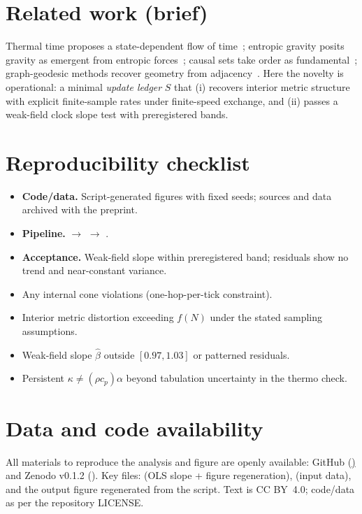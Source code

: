 \documentclass[11pt,a4paper]{article}
\begin{document}
\section*{Related work (brief)}
Thermal time proposes a state-dependent flow of time~\cite{Rovelli1993,Rovelli2011}; entropic gravity posits gravity as emergent from entropic forces~\cite{Verlinde2011}; causal sets take order as fundamental~\cite{Bombelli1987}; graph-geodesic methods recover geometry from adjacency~\cite{Tenenbaum2000}. Here the novelty is operational: a minimal \emph{update ledger} $S$ that (i) recovers interior metric structure with explicit finite-sample rates under finite-speed exchange, and (ii) passes a weak-field clock slope test with preregistered bands.

\section*{Reproducibility checklist}
\begin{itemize}
  \item \textbf{Code/data.} Script-generated figures with fixed seeds; sources and data archived with the preprint.
  \item \textbf{Pipeline.}  $\rightarrow$  $\rightarrow$ .
  \item \textbf{Acceptance.} Weak-field slope within preregistered band; residuals show no trend and near-constant variance.
\end{itemize}

\begin{tcolorbox}[title=Falsifiers (pre-registered)]
\begin{itemize}
  \item Any internal cone violations (one-hop-per-tick constraint).
  \item Interior metric distortion exceeding $f(N)$ under the stated sampling assumptions.
  \item Weak-field slope $\hat\beta$ outside $[0.97,1.03]$ or patterned residuals.
  \item Persistent $\kappa \neq (\rho c_p)\alpha$ beyond tabulation uncertainty in the thermo check.
\end{itemize}
\end{tcolorbox}

\section*{Data and code availability}
All materials to reproduce the analysis and figure are openly available:
GitHub (\href{\RepoURL}) and Zenodo v0.1.2
(). Key files:
 (OLS slope + figure regeneration),
 (input data), and the output figure
 regenerated from the script.
Text is CC BY~4.0; code/data as per the repository LICENSE.
\end{document}
